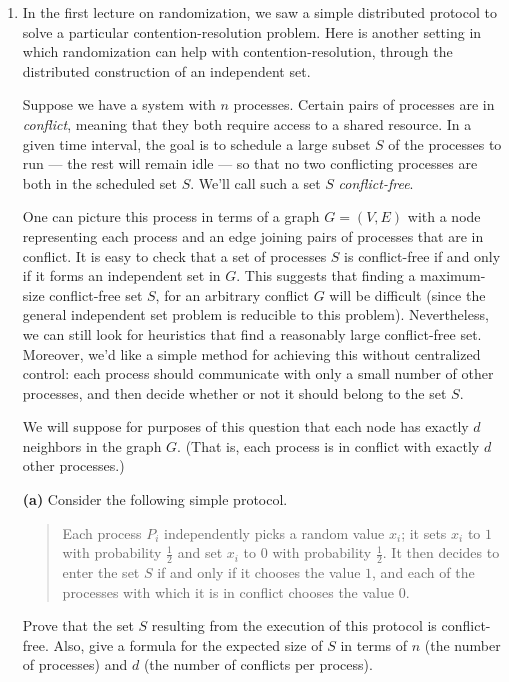 \documentclass[12pt]{article}
\begin{document}
\begin{enumerate}




\item

In the first lecture on randomization, we saw a simple
distributed protocol to solve a particular contention-resolution problem.
Here is another setting in which randomization
can help with contention-resolution, through the distributed
construction of an independent set.

Suppose we have a system with $n$ processes.
Certain pairs of processes are in {\em conflict},
meaning that they both require access to a shared resource.
In a given time interval, the goal is to schedule
a large subset $S$ of the processes to run --- the rest
will remain idle --- so that no two conflicting
processes are both in the scheduled set $S$.
We'll call such a set $S$ {\em conflict-free}.

One can picture this process in terms of a
graph $G = (V,E)$ with a node representing each process
and an edge joining pairs of processes that are in conflict.
It is easy to check that a set of processes $S$ is conflict-free
if and only if it forms an independent set in $G$.
This suggests that finding a maximum-size conflict-free set $S$,
for an arbitrary conflict $G$ will be difficult
(since the general independent set problem is reducible to
this problem).
Nevertheless, we can still look for heuristics
that find a reasonably large conflict-free set.
Moreover, we'd like a simple method for achieving this
without centralized control:
each process should communicate with only a small
number of other processes, and then decide whether or
not it should belong to the set $S$.

We will suppose for purposes of this question that each node
has exactly $d$ neighbors in the graph $G$.
(That is, each process is in conflict with exactly $d$
other processes.)

\medskip
{\bf (a)} Consider the following simple protocol.
\begin{quote}
Each process $P_i$ independently picks a random value $x_i$;
it sets $x_i$ to $1$ with probability $\frac12$
and set $x_i$ to $0$ with probability $\frac12$.
It then decides to enter the set $S$ if and only if
it chooses the value $1$, and each of the processes with
which it is in conflict chooses the value $0$.
\end{quote}
Prove that the set $S$ resulting from the
execution of this protocol is conflict-free.
Also, give a formula for the expected size of $S$
in terms of $n$ (the number of processes)
and $d$ (the number of conflicts per process).


\end{enumerate}
\end{document}
